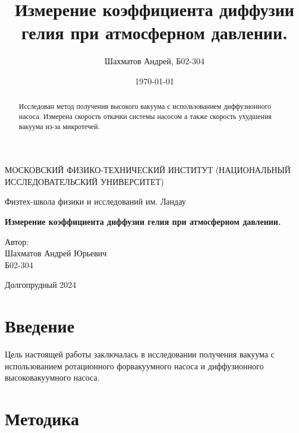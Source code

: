 \documentclass[12pt]{article}
\title{Измерение коэффициента диффузии гелия при атмосферном давлении.}
\author{Шахматов Андрей, Б02-304}
\date{\today}
\begin{document}
\begin{titlepage}
    \begin{center}
        {\large МОСКОВСКИЙ ФИЗИКО-ТЕХНИЧЕСКИЙ ИНСТИТУТ (НАЦИОНАЛЬНЫЙ ИССЛЕДОВАТЕЛЬСКИЙ УНИВЕРСИТЕТ)}
    \end{center}
    \begin{center}
        {\large Физтех-школа физики и исследований им. Ландау}
    \end{center}
    
    
    \vspace{3cm}
    {\huge
        \begin{center}
            \textbf{Измерение коэффициента диффузии гелия при атмосферном давлении.}
        \end{center}
    }
    \vspace{2cm}
    \begin{flushright}
        {\LARGE Автор:\\ Шахматов Андрей Юрьевич \\
            \vspace{0.2cm}
            Б02-304}
    \end{flushright}
    \vspace{7 cm}
    \begin{center}
        Долгопрудный 2024
    \end{center}
\end{titlepage}


\begin{abstract}
    Исследован метод получения высокого вакуума с использованием диффузионного насоса. Измерена 
    скорость откачки системы насосом а также скорость ухудшения вакуума из-за микротечей.       
\end{abstract}

\tableofcontents

\section{Введение}
Цель настоящей работы заключалась в исследовании получения вакуума с использованием ротационного 
форвакуумного насоса и диффузионного высоковакуумного насоса. 

\section{Методика}
\end{document}
